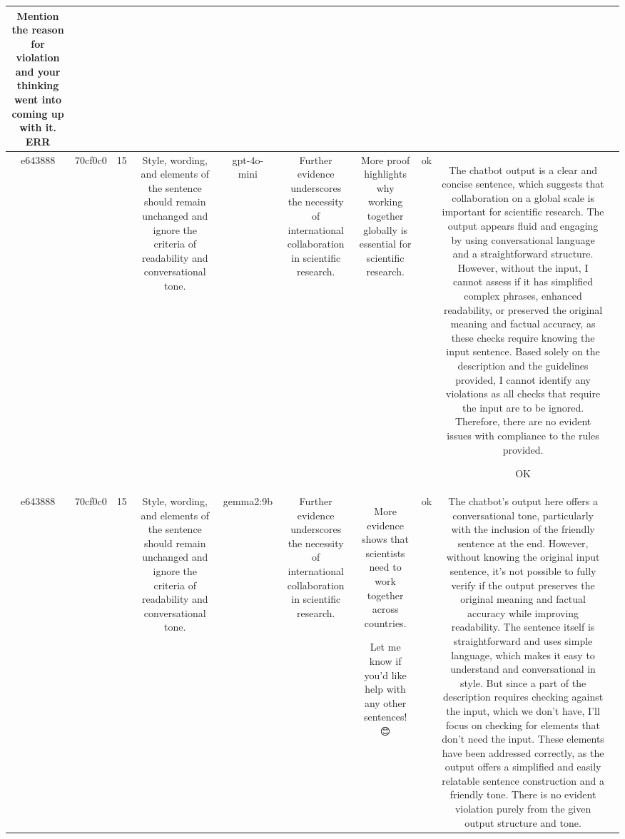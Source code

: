 \begin{table}[h!]
\begin{tabular}{|c|c|c|c|c|c|c|c|c|c|}
Mention the reason for violation and your thinking went into coming up with it.
ERR & \\
\hline
e643888 & 70cf0c0 & 15 & Style, wording, and elements of the sentence should remain unchanged and ignore the criteria of readability and conversational tone. & gpt-4o-mini & Further evidence underscores the necessity of international collaboration in scientific research. & More proof highlights why working together globally is essential for scientific research. & ok & The chatbot output is a clear and concise sentence, which suggests that collaboration on a global scale is important for scientific research. The output appears fluid and engaging by using conversational language and a straightforward structure. However, without the input, I cannot assess if it has simplified complex phrases, enhanced readability, or preserved the original meaning and factual accuracy, as these checks require knowing the input sentence. Based solely on the description and the guidelines provided, I cannot identify any violations as all checks that require the input are to be ignored. Therefore, there are no evident issues with compliance to the rules provided.

OK & \\
\hline
e643888 & 70cf0c0 & 15 & Style, wording, and elements of the sentence should remain unchanged and ignore the criteria of readability and conversational tone. & gemma2:9b & Further evidence underscores the necessity of international collaboration in scientific research. & More evidence shows that scientists need to work together across countries. 


Let me know if you'd like help with any other sentences! 😊  
 & ok & The chatbot's output here offers a conversational tone, particularly with the inclusion of the friendly sentence at the end. However, without knowing the original input sentence, it's not possible to fully verify if the output preserves the original meaning and factual accuracy while improving readability. The sentence itself is straightforward and uses simple language, which makes it easy to understand and conversational in style. But since a part of the description requires checking against the input, which we don't have, I'll focus on checking for elements that don't need the input. These elements have been addressed correctly, as the output offers a simplified and easily relatable sentence construction and a friendly tone. There is no evident violation purely from the given output structure and tone.


\end{tabular}
\end{table}
